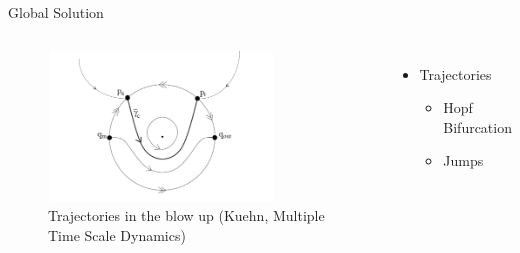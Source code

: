 \documentclass[11pt]{beamer}
\begin{document}
\begin{frame}{Global Solution}
\begin{columns}
	\begin{figure}
		\centering
\includegraphics[height=4cm,width=6cm]{Images/pres-cancard}
		\caption{Trajectories in the blow up (Kuehn, Multiple Time Scale Dynamics)}
		
	\end{figure}
	\begin{itemize}
		\item Trajectories
		\begin{itemize}
			\item Hopf Bifurcation
			\item Jumps
		\end{itemize}
		
	\end{itemize}
\end{columns}
\end{frame}
\end{document}
